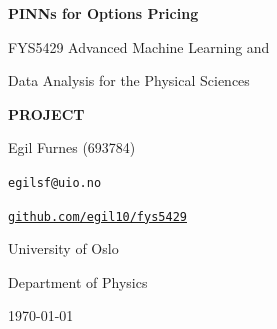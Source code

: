 \begin{center}
{\Huge\bfseries PINNs for Options Pricing \par}
\vspace{0.4cm}
\begin{minipage}{0.43\linewidth}
\justifying
{\large FYS5429 Advanced Machine Learning and \par Data Analysis for the Physical Sciences}
\end{minipage}

\vspace{0.3cm}
{\large \textbf{PROJECT} \par}
\vspace{0.4cm}

\begin{minipage}{0.48\linewidth}
\raggedright
{\large Egil Furnes (693784) \par}
\texttt{egilsf@uio.no} \par
\href{https://github.com/egil10/fys5429}{\texttt{github.com/egil10/fys5429}}
\end{minipage}
\hfill
\begin{minipage}{0.48\linewidth}
\raggedleft
University of Oslo \par
Department of Physics \par
\today
\end{minipage}
\end{center}